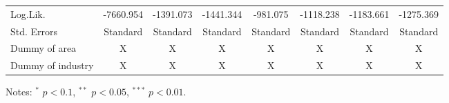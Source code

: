 \documentclass[
  11pt,
  a4paper,
]{article}
\begin{document}
\begin{table}[H]
{\begin{threeparttable}
\begin{tabular}[t]{lccccccc}
Log.Lik. & -7660.954 & -1391.073 & -1441.344 & -981.075 & -1118.238 & -1183.661 & -1275.369\\
Std. Errors & Standard & Standard & Standard & Standard & Standard & Standard & Standard\\
Dummy of area & X & X & X & X & X & X & X\\
Dummy of industry & X & X & X & X & X & X & X\\
\bottomrule
\end{tabular}
\begin{tablenotes}
\item Notes: $^{*}$ $p < 0.1$, $^{**}$ $p < 0.05$, $^{***}$ $p < 0.01$.
\end{tablenotes}
\end{threeparttable}}
\end{table}
\end{document}
